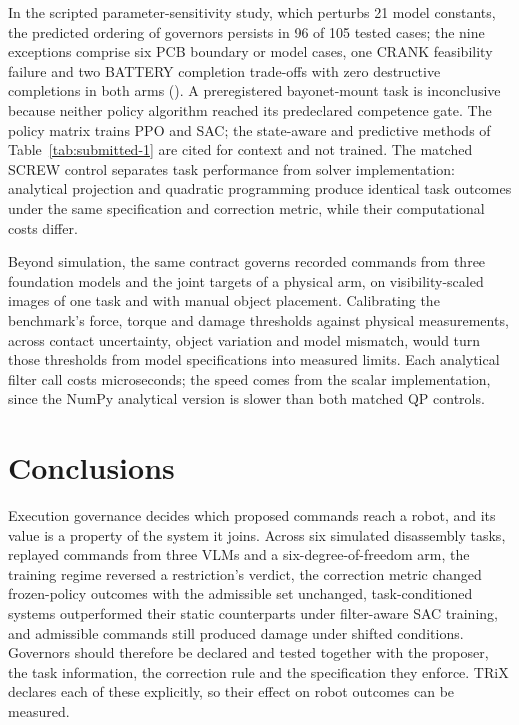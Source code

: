 \documentclass[12pt]{article}
\newcommand{\secneed}{14}
\begin{document}
In the scripted parameter-sensitivity study, which perturbs 21 model
constants, the predicted ordering of governors persists in 96 of 105 tested
cases; the nine exceptions comprise six PCB boundary or model cases, one CRANK
feasibility failure and two BATTERY completion trade-offs with zero destructive
completions in both arms (). A preregistered bayonet-mount task
is inconclusive because neither policy algorithm reached its predeclared
competence gate. The policy matrix trains PPO and
SAC; the state-aware and predictive methods of Table~\ref{tab:submitted-1} are
cited for context and not trained. The matched SCREW control separates task
performance from solver implementation: analytical projection and quadratic
programming produce identical task outcomes under the same specification and
correction metric, while their computational costs differ.

Beyond simulation, the same contract governs recorded commands from three
foundation models and the joint targets of a physical arm, on visibility-scaled
images of one task and with manual object placement. Calibrating the
benchmark's force, torque and damage thresholds against physical measurements,
across contact uncertainty, object variation and model mismatch, would turn
those thresholds from model specifications into measured limits. Each analytical filter call costs microseconds; the speed comes
from the scalar implementation, since the NumPy analytical version is slower
than both matched QP controls.

\section{Conclusions}
Execution governance decides which proposed commands reach a robot, and its
value is a property of the system it joins. Across six simulated disassembly
tasks, replayed commands from three VLMs and a six-degree-of-freedom arm, the
training regime reversed a restriction's verdict, the correction metric
changed frozen-policy outcomes with the admissible set unchanged, task-conditioned systems outperformed their static counterparts under filter-aware SAC training,
and admissible commands still produced damage under shifted conditions.
Governors should therefore be declared and tested together with the proposer,
the task information, the correction rule and the specification they enforce.
TRiX declares each of these explicitly, so their effect on robot outcomes can be measured.

\renewcommand{\secneed}{14}
\end{document}

